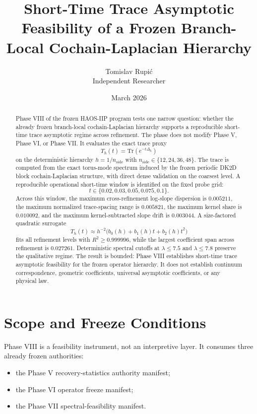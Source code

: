 \documentclass[11pt]{article}
\title{Short-Time Trace Asymptotic Feasibility of a Frozen Branch-Local Cochain-Laplacian Hierarchy}
\author{Tomislav Rupi\'c \\ Independent Researcher}
\date{March 2026}
\begin{document}
\maketitle

\begin{abstract}
Phase VIII of the frozen HAOS-IIP program tests one narrow question: whether the already frozen branch-local cochain-Laplacian hierarchy supports a reproducible short-time trace asymptotic regime across refinement. The phase does not modify Phase V, Phase VI, or Phase VII. It evaluates the exact trace proxy
\[
T_h(t) = \mathrm{Tr}\!\left(e^{-t \Delta_h}\right)
\]
on the deterministic hierarchy $h = 1 / n_{\mathrm{side}}$ with $n_{\mathrm{side}} \in \{12,24,36,48\}$. The trace is computed from the exact torus-mode spectrum induced by the frozen periodic DK2D block cochain-Laplacian structure, with direct dense validation on the coarsest level. A reproducible operational short-time window is identified on the fixed probe grid:
\[
t \in \{0.02, 0.03, 0.05, 0.075, 0.1\}.
\]
Across this window, the maximum cross-refinement log-slope dispersion is $0.005211$, the maximum normalized trace-spacing range is $0.005821$, the maximum kernel share is $0.010092$, and the maximum kernel-subtracted slope drift is $0.003044$. A size-factored quadratic surrogate
\[
T_h(t) \approx h^{-2}\bigl(b_0(h) + b_1(h)t + b_2(h)t^2\bigr)
\]
fits all refinement levels with $R^2 \ge 0.999996$, while the largest coefficient span across refinement is $0.027261$. Deterministic spectral cutoffs at $\lambda \le 7.5$ and $\lambda \le 7.8$ preserve the qualitative regime. The result is bounded: Phase VIII establishes short-time trace asymptotic feasibility for the frozen operator hierarchy. It does not establish continuum correspondence, geometric coefficients, universal asymptotic coefficients, or any physical law.
\end{abstract}

\section{Scope and Freeze Conditions}

Phase VIII is a feasibility instrument, not an interpretive layer. It consumes three already frozen authorities:
\begin{itemize}
\item the Phase V recovery-statistics authority manifest;
\item the Phase VI operator freeze manifest;
\item the Phase VII spectral-feasibility manifest.
\end{itemize}
\end{document}
